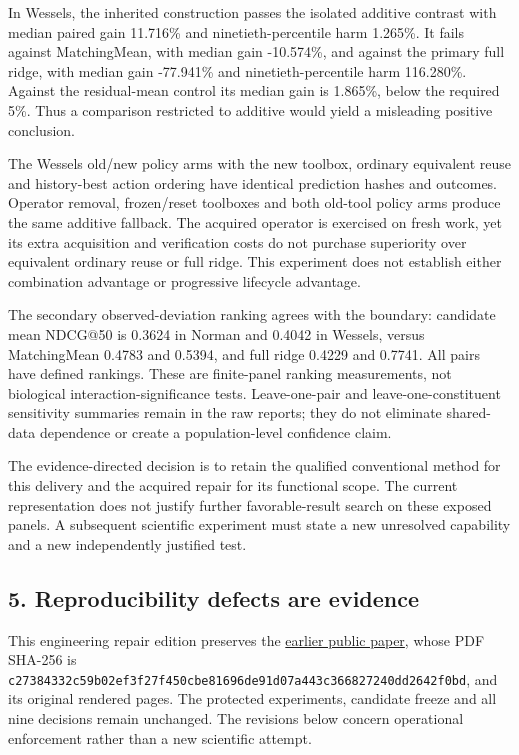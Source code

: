 \documentclass[
  10pt,
]{article}
\begin{document}
In Wessels, the inherited construction passes the isolated additive
contrast with median paired gain 11.716\% and ninetieth-percentile harm
1.265\%. It fails against MatchingMean, with median gain -10.574\%, and
against the primary full ridge, with median gain -77.941\% and
ninetieth-percentile harm 116.280\%. Against the residual-mean control
its median gain is 1.865\%, below the required 5\%. Thus a comparison
restricted to additive would yield a misleading positive conclusion.

The Wessels old/new policy arms with the new toolbox, ordinary
equivalent reuse and history-best action ordering have identical
prediction hashes and outcomes. Operator removal, frozen/reset toolboxes
and both old-tool policy arms produce the same additive fallback. The
acquired operator is exercised on fresh work, yet its extra acquisition
and verification costs do not purchase superiority over equivalent
ordinary reuse or full ridge. This experiment does not establish either
combination advantage or progressive lifecycle advantage.

The secondary observed-deviation ranking agrees with the boundary:
candidate mean NDCG@50 is 0.3624 in Norman and 0.4042 in Wessels, versus
MatchingMean 0.4783 and 0.5394, and full ridge 0.4229 and 0.7741. All
pairs have defined rankings. These are finite-panel ranking
measurements, not biological interaction-significance tests.
Leave-one-pair and leave-one-constituent sensitivity summaries remain in
the raw reports; they do not eliminate shared-data dependence or create
a population-level confidence claim.

The evidence-directed decision is to retain the qualified conventional
method for this delivery and the acquired repair for its functional
scope. The current representation does not justify further
favorable-result search on these exposed panels. A subsequent scientific
experiment must state a new unresolved capability and a new
independently justified test.

\hypertarget{reproducibility-defects-are-evidence}{%
\subsection{5. Reproducibility defects are
evidence}\label{reproducibility-defects-are-evidence}}

This engineering repair edition preserves the
\href{https://github.com/MontrealAI/AGI-Alpha-Invention-Flywheel-Lab/blob/fbb0a1729cdaf6a2c7e410f3f15746d3b95c2471/docs/research/cycle-006.pdf}{earlier
public paper}, whose PDF SHA-256 is
\nolinkurl{c27384332c59b02ef3f27f450cbe81696de91d07a443c366827240dd2642f0bd},
and its original rendered pages. The protected experiments, candidate
freeze and all nine decisions remain unchanged. The revisions below
concern operational enforcement rather than a new scientific attempt.
\end{document}
